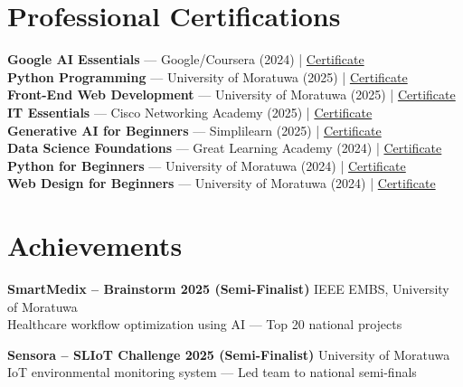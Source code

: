 \documentclass[letterpaper,10pt]{article}
\begin{document}
\section{Professional Certifications}
\vspace{-1pt}

\textbf{Google AI Essentials} — Google/Coursera (2024) | \href{https://coursera.org/verify/specialization/JZOWGO7JRRHB}{Certificate}\\
\textbf{Python Programming} — University of Moratuwa (2025) | \href{https://open.uom.lk/verify?code=VTmcj35vju}{Certificate}\\
\textbf{Front-End Web Development} — University of Moratuwa (2025) | \href{https://open.uom.lk/verify?code=BHzCLZLb5G}{Certificate}\\
\textbf{IT Essentials} — Cisco Networking Academy (2025) | \href{https://www.credly.com/badges/6111bbbe-db9e-438f-981d-c770b9fae03c}{Certificate}\\
\textbf{Generative AI for Beginners} — Simplilearn (2025) | \href{https://www.linkedin.com/in/vindya-kodithuwakku-bb6187202/details/certifications/1760065621808/}{Certificate}\\
\textbf{Data Science Foundations} — Great Learning Academy (2024) | \href{https://www.mygreatlearning.com/certificate/XGIRSIHP}{Certificate}\\
\textbf{Python for Beginners} — University of Moratuwa (2024) | \href{https://open.uom.lk/verify?code=xw4fpfB8ZS}{Certificate}\\
\textbf{Web Design for Beginners} — University of Moratuwa (2024) | \href{https://open.uom.lk/verify?code=kjyQ67aXNP}{Certificate}

\section{Achievements}
\vspace{-1pt}

\noindent\textbf{SmartMedix – Brainstorm 2025 (Semi-Finalist)} \hfill IEEE EMBS, University of Moratuwa\\
\noindent Healthcare workflow optimization using AI — Top 20 national projects

\vspace{2pt}
\noindent\textbf{Sensora – SLIoT Challenge 2025 (Semi-Finalist)} \hfill University of Moratuwa\\
\noindent IoT environmental monitoring system — Led team to national semi-finals
\end{document}
